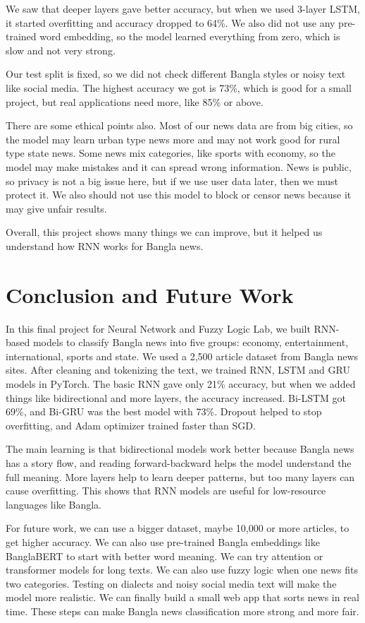 \documentclass[pdflatex,sn-mathphys-num]{sn-jnl}
\theoremstyle{thmstyleone}\newtheorem{theorem}{Theorem}
\theoremstyle{thmstyletwo}\newtheorem{example}{Example}\newtheorem{remark}{Remark}
\theoremstyle{thmstylethree}\newtheorem{definition}{Definition}
\begin{document}
We saw that deeper layers gave better accuracy, but when we used 3-layer LSTM, it started overfitting and accuracy dropped to 64\%. We also did not use any pre-trained word embedding, so the model learned everything from zero, which is slow and not very strong.

Our test split is fixed, so we did not check different Bangla styles or noisy text like social media. The highest accuracy we got is 73\%, which is good for a small project, but real applications need more, like 85\% or above.

There are some ethical points also. Most of our news data are from big cities, so the model may learn urban type news more and may not work good for rural type state news. Some news mix categories, like sports with economy, so the model may make mistakes and it can spread wrong information. News is public, so privacy is not a big issue here, but if we use user data later, then we must protect it. We also should not use this model to block or censor news because it may give unfair results.

Overall, this project shows many things we can improve, but it helped us understand how RNN works for Bangla news.

\section{Conclusion and Future Work}

In this final project for Neural Network and Fuzzy Logic Lab, we built RNN-based models to classify Bangla news into five groups: economy, entertainment, international, sports and state. We used a 2,500 article dataset from Bangla news sites. After cleaning and tokenizing the text, we trained RNN, LSTM and GRU models in PyTorch. The basic RNN gave only 21\% accuracy, but when we added things like bidirectional and more layers, the accuracy increased. Bi-LSTM got 69\%, and Bi-GRU was the best model with 73\%. Dropout helped to stop overfitting, and Adam optimizer trained faster than SGD.

The main learning is that bidirectional models work better because Bangla news has a story flow, and reading forward-backward helps the model understand the full meaning. More layers help to learn deeper patterns, but too many layers can cause overfitting. This shows that RNN models are useful for low-resource languages like Bangla.

For future work, we can use a bigger dataset, maybe 10,000 or more articles, to get higher accuracy. We can also use pre-trained Bangla embeddings like BanglaBERT to start with better word meaning. We can try attention or transformer models for long texts. We can also use fuzzy logic when one news fits two categories. Testing on dialects and noisy social media text will make the model more realistic. We can finally build a small web app that sorts news in real time. These steps can make Bangla news classification more strong and more fair.
\end{document}
